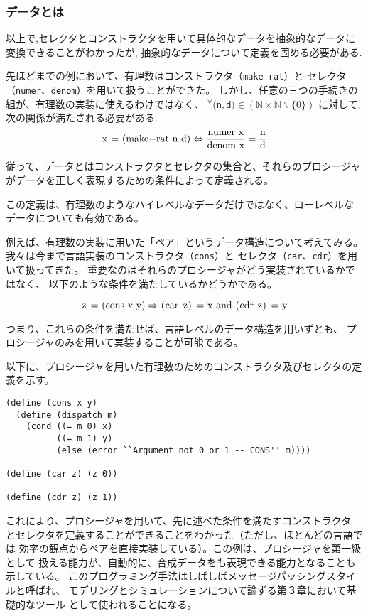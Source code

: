 \subsubsection{データとは}
以上で,セレクタとコンストラクタを用いて具体的なデータを抽象的なデータに
変換できることがわかったが, 抽象的なデータについて定義を固める必要がある.

\noindent
先ほどまでの例において、有理数はコンストラクタ（\lstinline{make-rat}）と
セレクタ（\lstinline{numer}、\lstinline{denom}）を用いて扱うことができた。
しかし、任意の三つの手続きの組が、有理数の実装に使えるわけではなく、
${}^{\forall} ($\lstinline{n}$, $\lstinline{d}$)
\in (\mathbb{N}\times \mathbb{N}\backslash \{0\})$
に対して, 次の関係が満たされる必要がある.
\[
  \text{\lstinline{x = (make-rat n d)}} \Leftrightarrow
  \frac{\text{\lstinline{numer x}}}{\text{\lstinline{denom x}}}
  = \frac{\text{\lstinline{n}}}{\text{\lstinline{d}}}
\]

従って、データとはコンストラクタとセレクタの集合と、それらのプロシージャ
がデータを正しく表現するための条件によって定義される。

この定義は、有理数のようなハイレベルなデータだけではなく、ローレベルな
データについても有効である。

例えば、有理数の実装に用いた「ペア」というデータ構造について考えてみる。
我々は今まで言語実装のコンストラクタ（\lstinline{cons}）と
セレクタ（\lstinline{car}、\lstinline{cdr}）を用いて扱ってきた。
重要なのはそれらのプロシージャがどう実装されているかではなく、
以下のような条件を満たしているかどうかである。

\[
  \text{\lstinline{z = (cons x y)}} \Rightarrow
  \text{\lstinline{(car z) = x}} \ \text{\lstinline{and}} \ \text{\lstinline{(cdr z) = y}}
\]

つまり、これらの条件を満たせば、言語レベルのデータ構造を用いずとも、
プロシージャのみを用いて実装することが可能である。

以下に、プロシージャを用いた有理数のためのコンストラクタ及びセレクタの定義を示す。

\begin{lstlisting}[basicstyle=\footnotesize,title=プロシージャによるペアの実装]
(define (cons x y)
  (define (dispatch m)
    (cond ((= m 0) x)
          ((= m 1) y)
          (else (error ``Argument not 0 or 1 -- CONS'' m))))

(define (car z) (z 0))

(define (cdr z) (z 1))
\end{lstlisting}
\vspace{5mm}

これにより、プロシージャを用いて、先に述べた条件を満たすコンストラクタ
とセレクタを定義することができることをわかった（ただし、ほとんどの言語では
効率の観点からペアを直接実装している）。この例は、プロシージャを第一級として
扱える能力が、自動的に、合成データをも表現できる能力となることも示している。
このプログラミング手法はしばしばメッセージパッシングスタイルと呼ばれ、
モデリングとシミュレーションについて論ずる第３章において基礎的なツール
として使われることになる。
